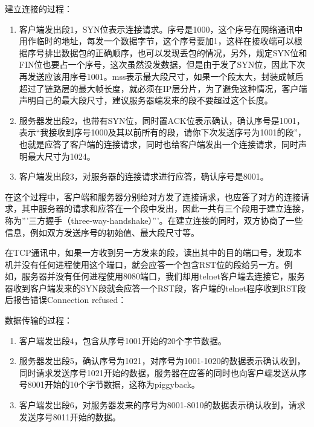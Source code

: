 建立连接的过程：


\begin{enumerate}

\item 客户端发出段1，SYN位表示连接请求。序号是1000，这个序号在网络通讯中用作临时的地址，每发一个数据字节，这个序号要加1，这样在接收端可以根据序号排出数据包的正确顺序，也可以发现丢包的情况，另外，规定SYN位和FIN位也要占一个序号，这次虽然没发数据，但是由于发了SYN位，因此下次再发送应该用序号1001。mss表示最大段尺寸，如果一个段太大，封装成帧后超过了链路层的最大帧长度，就必须在IP层分片，为了避免这种情况，客户端声明自己的最大段尺寸，建议服务器端发来的段不要超过这个长度。

\item 服务器发出段2，也带有SYN位，同时置ACK位表示确认，确认序号是1001，表示“我接收到序号1000及其以前所有的段，请你下次发送序号为1001的段”，也就是应答了客户端的连接请求，同时也给客户端发出一个连接请求，同时声明最大尺寸为1024。

\item 客户端发出段3，对服务器的连接请求进行应答，确认序号是8001。
\end{enumerate}


在这个过程中，客户端和服务器分别给对方发了连接请求，也应答了对方的连接请求，其中服务器的请求和应答在一个段中发出，因此一共有三个段用于建立连接，称为'''三方握手（three-way-handshake）'''。在建立连接的同时，双方协商了一些信息，例如双方发送序号的初始值、最大段尺寸等。



在TCP通讯中，如果一方收到另一方发来的段，读出其中的目的端口号，发现本机并没有任何进程使用这个端口，就会应答一个包含RST位的段给另一方。例如，服务器并没有任何进程使用8080端口，我们却用telnet客户端去连接它，服务器收到客户端发来的SYN段就会应答一个RST段，客户端的telnet程序收到RST段后报告错误Connection refused：




数据传输的过程：


\begin{enumerate}

\item 客户端发出段4，包含从序号1001开始的20个字节数据。

\item 服务器发出段5，确认序号为1021，对序号为1001-1020的数据表示确认收到，同时请求发送序号1021开始的数据，服务器在应答的同时也向客户端发送从序号8001开始的10个字节数据，这称为piggyback。

\item 客户端发出段6，对服务器发来的序号为8001-8010的数据表示确认收到，请求发送序号8011开始的数据。
\end{enumerate}


